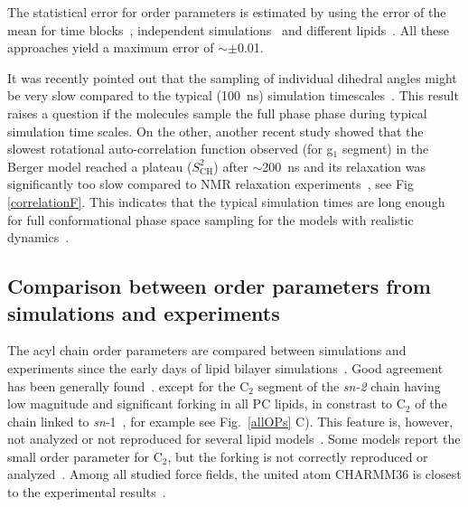 \documentclass[aps,prl,superscriptaddress,twocolumn]{revtex4}
\begin{document}
The statistical error for order parameters is estimated by using the error of the mean for time blocks~\cite{ollila07a},  
independent simulations~\cite{poger12} and different lipids~\cite{botan15}. All these approaches yield a maximum error of $\sim \pm$0.01.

It was recently pointed out that the sampling of individual dihedral angles might be very
slow compared to the typical (100~ns) simulation timescales~\cite{vogel12}.
This result raises a question if the molecules sample the full phase phase
during typical simulation time scales. On the other, another recent study showed
that the slowest rotational auto-correlation function observed (for g$_1$ segment) 
in the Berger model reached a plateau ($S_\mathrm{CH}^2$) after $\sim$200~ns
and its relaxation was significantly too slow compared to NMR relaxation experiments~\cite{ferreira15},
see Fig \ref{correlationF}. 
This indicates that the typical simulation times are long enough for full conformational 
phase space sampling for the models with realistic dynamics~\cite{ferreira15}.



\subsection{Comparison between order parameters from simulations and experiments}

The acyl chain order parameters are compared between simulations and experiments since the early days of lipid bilayer simulations~\cite{ploeg82,egberts88,stouch93,egberts94,essex94,robinson94,hyvonen95,kothekar96,tieleman96,shinoda97,berger97,tieleman97,klauda08b}. 
Good agreement has been generally found~\cite{berger97,hogberg08,poger10,ulmschneider09,kukol09,chiu09,klauda10,dickson12,jambeck12,chowdhary13,maciejewski14,tjornhammar14,dickson14,lee14}.
except for the C$_2$ segment of the {\it sn-2} chain having low magnitude and significant forking in all PC lipids, in constrast to C$_2$ of the chain linked to
{\it sn}-1~\cite{seelig74,seelig75,gross97,dvinskikh05a,ferreira13}, for example see Fig.~\ref{allOPs} C). 
This feature is, however, not analyzed or not reproduced for several lipid models~\cite{hogberg08,siu08,chiu09,kukol09,ulmschneider09,jambeck12,dickson12,chowdhary13,tjornhammar14,maciejewski14}.
Some models report the small order parameter for C$_2$,  but the forking is not correctly reproduced 
or analyzed~\cite{siu08,klauda10,chowdhary13,dickson14}.
Among all studied force fields, the united atom CHARMM36 is closest to the experimental results~\cite{lee14}.
\end{document}
